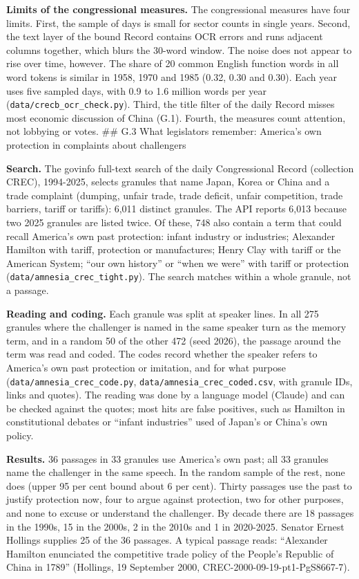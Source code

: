 \textbf{Limits of the congressional measures.} The congressional
measures have four limits. First, the sample of days is small for sector
counts in single years. Second, the text layer of the bound Record
contains OCR errors and runs adjacent columns together, which blurs the
30-word window. The noise does not appear to rise over time, however.
The share of 20 common English function words in all word tokens is
similar in 1958, 1970 and 1985 (0.32, 0.30 and 0.30). Each year uses
five sampled days, with 0.9 to 1.6 million words per year
(\texttt{data/\allowbreak{}crecb\_\allowbreak{}ocr\_\allowbreak{}check.py}). Third, the title filter of the
daily Record misses most economic discussion of China (G.1). Fourth, the
measures count attention, not lobbying or votes. \#\# G.3 What
legislators remember: America's own protection in complaints about
challengers

\textbf{Search.} The govinfo full-text search of the daily Congressional
Record (collection CREC), 1994-2025, selects granules that name Japan,
Korea or China and a trade complaint (dumping, unfair trade, trade
deficit, unfair competition, trade barriers, tariff or tariffs): 6,011
distinct granules. The API reports 6,013 because two 2025 granules are
listed twice. Of these, 748 also contain a term that could recall
America's own past protection: infant industry or industries; Alexander
Hamilton with tariff, protection or manufactures; Henry Clay with tariff
or the American System; ``our own history'' or ``when we were'' with
tariff or protection (\texttt{data/\allowbreak{}amnesia\_\allowbreak{}crec\_\allowbreak{}tight.py}). The search
matches within a whole granule, not a passage.

\textbf{Reading and coding.} Each granule was split at speaker lines. In
all 275 granules where the challenger is named in the same speaker turn
as the memory term, and in a random 50 of the other 472 (seed 2026), the
passage around the term was read and coded. The codes record whether the
speaker refers to America's own past protection or imitation, and for
what purpose (\texttt{data/\allowbreak{}amnesia\_\allowbreak{}crec\_\allowbreak{}code.py},
\texttt{data/\allowbreak{}amnesia\_\allowbreak{}crec\_\allowbreak{}coded.csv}, with granule IDs, links and
quotes). The reading was done by a language model (Claude) and can be
checked against the quotes; most hits are false positives, such as
Hamilton in constitutional debates or ``infant industries'' used of
Japan's or China's own policy.

\textbf{Results.} 36 passages in 33 granules use America's own past; all
33 granules name the challenger in the same speech. In the random sample
of the rest, none does (upper 95 per cent bound about 6 per cent).
Thirty passages use the past to justify protection now, four to argue
against protection, two for other purposes, and none to excuse or
understand the challenger. By decade there are 18 passages in the 1990s,
15 in the 2000s, 2 in the 2010s and 1 in 2020-2025. Senator Ernest
Hollings supplies 25 of the 36 passages. A typical passage reads:
``Alexander Hamilton enunciated the competitive trade policy of the
People's Republic of China in 1789'' (Hollings, 19 September 2000,
CREC-2000-09-19-pt1-PgS8667-7).

